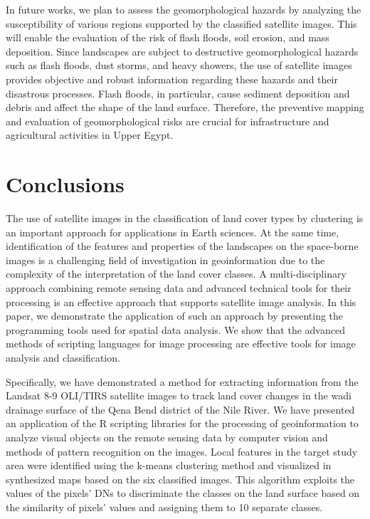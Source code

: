 \documentclass[information,article,accept,pdftex,moreauthors]{Definitions/mdpi}
\begin{document}
{In }future works, {we plan to assess the }geomorphological hazards by {analyzing the }susceptibility of various regions supported by the classified satellite images{. This will enable the evaluation of the risk of flash floods}, soil erosion{, and mass deposition. Since } landscapes are subject to destructive geomorphological hazards such as flash floods, dust storms{, }and heavy showers, {the use of satellite images provides }objective and robust information regarding these hazards and {their }disastrous processes. {Flash floods, in particular, cause sediment deposition }and debris and affect {the }shape of the land surface{. Therefore, the }preventive mapping and evaluation of {geomorphological risks are crucial }for infrastructure and agricultural activities in Upper Egypt.

\section{Conclusions}

{The use of satellite images in the classification of land cover types by clustering is an important approach for applications in Earth sciences. At the same time, identification of the features and properties of the landscapes on the space-borne images is a challenging field of investigation in geoinformation due to the complexity of the interpretation of the land cover classes. A multi-disciplinary approach combining remote sensing data and advanced technical tools for their processing is an effective approach that supports satellite image analysis. In this paper, we demonstrate the application of such an approach by presenting the programming tools used for spatial data analysis. We show that the advanced methods of scripting languages for image processing are effective tools for image analysis and classification.}

{Specifically}, we have demonstrated a method {for extracting }information from the Landsat 8-9 OLI/TIRS {satellite images }to track land cover changes in the wadi drainage surface of {the }Qena Bend district of the Nile River. We have presented an application of the R scripting libraries for the processing of geoinformation to analyze visual objects on the remote sensing data by computer vision and methods of pattern recognition on the images. Local features in the target study area were identified using the k-means clustering method and visualized {in synthesized }maps based on the {six classified }images. This algorithm exploits the values of the pixels' DNs to discriminate the classes on the land surface based on the similarity of pixels' values and assigning them to 10 {separate }classes. 
\end{document}

